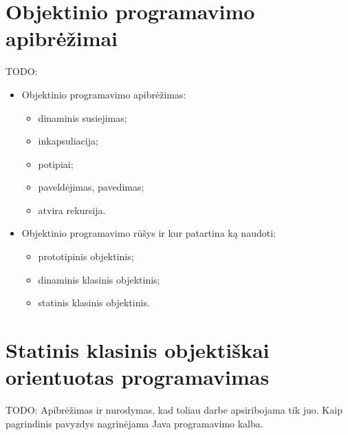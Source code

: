 \section{Objektinio programavimo apibrėžimai}

TODO:
\begin{itemize}
  \item Objektinio programavimo apibrėžimas:
    \begin{itemize}
      \item dinaminis susiejimas;
      \item inkapsuliacija;
      \item potipiai;
      \item paveldėjimas, pavedimas;
      \item atvira rekursija.
    \end{itemize}
  \item Objektinio programavimo rūšys ir kur patartina ką naudoti:
    \begin{itemize}
      \item prototipinis objektinis;
      \item dinaminis klasinis objektinis;
      \item statinis klasinis objektinis.
    \end{itemize}
\end{itemize}

\section{Statinis klasinis objektiškai orientuotas programavimas}

TODO: Apibrėžimas ir nurodymas, kad toliau darbe apsiribojama tik juo.
Kaip pagrindinis pavyzdys nagrinėjama Java programavimo kalba.
